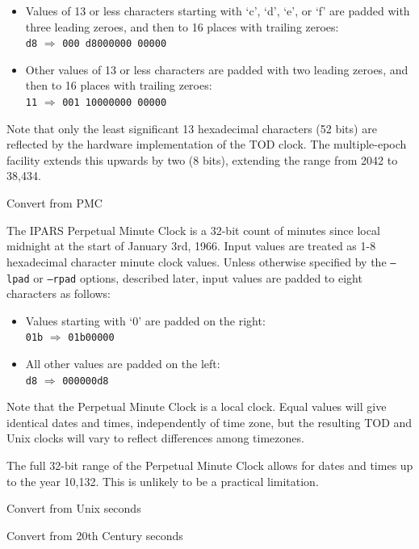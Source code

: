 \documentclass[a4paper,12pt,oneside,openany]{memoir}
\begin{document}
\begin{description}[format=\ttfamily]
\begin{itemize}
    \item Values of 13 or less characters starting with
    `c', `d', `e', or `f' are padded
    with three leading zeroes,
    and then to 16 places
    with trailing zeroes:\\[0.2\baselineskip]
    \texttt{d8} $ \Longrightarrow$
    \texttt{000 d8000000 00000}

    \item Other values of 13 or less characters are padded
    with two leading zeroes, and then to 16 places
    with trailing zeroes:\\[0.2\baselineskip]
    \texttt{11} $ \Longrightarrow$
    \texttt{001 10000000 00000}
  \end{itemize}

  Note that only the least significant 13 hexadecimal 
  characters (52 bits) are reflected by
  the hardware implementation of the TOD clock.
  The multiple-epoch facility extends this upwards
  by two (8 bits), extending the range
  from 2042 to 38,434.

  \item[-m,--pmc] Convert from PMC

  The IPARS Perpetual Minute Clock is a 32-bit 
  count of minutes since local midnight 
  at the start of January 3rd, 1966.
  Input values are treated as 1-8
  hexadecimal character minute clock values.
  Unless otherwise specified by
  the \texttt{--lpad} or \texttt{--rpad} options,
  described later,
  input values are padded to eight characters
  as follows:

  \begin{itemize}
    \item Values starting with `0'
    are padded on the right:\\[0.2\baselineskip]
    \texttt{01b} $ \Longrightarrow$
    \texttt{01b00000}

    \item All other values
    are padded on the left:\\[0.2\baselineskip]
    \texttt{d8} $ \Longrightarrow$
    \texttt{000000d8}

  \end{itemize}

  Note that the Perpetual Minute Clock is a local clock.
  Equal values will give identical dates and times, 
  independently of time zone, 
  but the resulting TOD and Unix clocks will vary 
  to reflect differences among timezones.

  The full 32-bit range of the Perpetual Minute Clock
  allows for dates and times up to the year 10,132.
  This is unlikely to be a practical limitation.

  \item[-u,--unix] Convert from Unix seconds


  \item[-s,--seconds] Convert from 20th Century seconds
\end{description}
\end{document}
